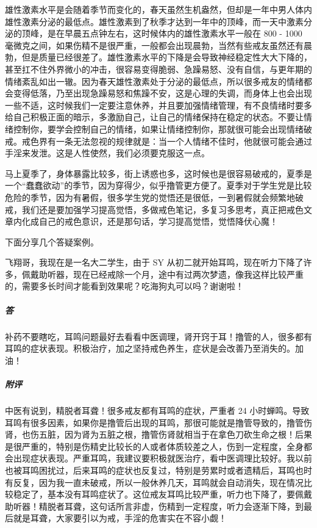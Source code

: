 雄性激素水平是会随着季节而变化的，春天虽然生机盎然，但却是一年中男人体内雄性激素分泌的最低点。雄性激素到了秋季才达到一年中的顶峰，而一天中激素分泌的顶峰，是在早晨五点钟左右，这时候体内的雄性激素水平一般在 800 - 1000 毫微克之间，如果伤精不是很严重，一般都会出现晨勃，当然有些戒友虽然还有晨勃，但是质量已经很差了。雄性激素水平的下降是会导致神经稳定性大大下降的，甚至扛不住外界微小的冲击，很容易变得脆弱、急躁易怒、没有自信，与更年期的情绪紊乱如出一辙。因为春天雄性激素处于分泌的最低点，所以很多戒友的情绪都会变得低落，乃至出现急躁易怒和焦躁不安，这是心理的失调，而身体上也会出现一些不适，这时候我们一定要注意休养，并且要加强情绪管理，有不良情绪时要多给自己积极正面的暗示，多激励自己，让自己的情绪保持在稳定的状态。不要让情绪控制你，要学会控制自己的情绪，如果让情绪控制你，那就很可能会出现情绪破戒。戒色界有一条无法忽视的规律就是：当一个人情绪不佳时，他就很可能会通过手淫来发泄。这是人性使然，我们必须要克服这一点。

马上夏季了，身体暴露比较多，街上诱惑也多，这时候也是很容易破戒的，夏季是一个“蠢蠢欲动”的季节，因为穿得少，似乎撸管更方便了。夏季对于学生党是比较危险的季节，因为有暑假，很多学生党的觉悟还是很低，一到暑假就会频繁地破戒，我们还是要加强学习提高觉悟，多做戒色笔记，多复习多思考，真正把戒色文章内化成自己的戒色意识，还是那句话，学习提高觉悟，觉悟降伏心魔！

下面分享几个答疑案例。

\begin{case}
    飞翔哥，我现在是一名大二学生，由于 SY 从初二就开始耳鸣，现在听力下降了许多，佩戴助听器，现在已经戒除一个月，途中有过两次梦遗，像我这样比较严重的，需要多长时间才能看到效果呢？吃海狗丸可以吗？谢谢啦！
    \subparagraph{答} 补药不要瞎吃，耳鸣问题最好去看看中医调理，肾开窍于耳！撸管的人，很多都有耳鸣的症状表现。积极治疗，加之坚持戒色养生，症状是会改善乃至消失的。加油！
    \subparagraph{附评} 中医有说到，精脱者耳聋！很多戒友都有耳鸣的症状，严重者 24 小时蝉鸣。导致耳鸣有很多因素，如果你是撸管后出现的耳鸣，那很可能就是撸管导致的，撸管伤肾，也伤五脏，因为肾为五脏之根，撸管伤肾就相当于在拿色刀砍生命之根！后果是很严重的，特别是伤精史比较长的人或者体质较差之人，伤到一定程度，全身都会出现症状表现。严重耳鸣，我建议要积极就医治疗，看中医调理比较好。我以前也被耳鸣困扰过，后来耳鸣的症状也反复过，特别是劳累时或者遗精后，耳鸣也时有反复，因为我一直未破戒，所以一般休养几天，耳鸣就会自动消失，现在情况比较稳定了，基本没有耳鸣症状了。这位戒友耳鸣比较严重，听力也下降了，要佩戴助听器！精脱者耳聋，这句话所言非虚，伤精到一定程度，听力会逐渐下降，到最后就是耳聋，大家要引以为戒，手淫的危害实在不容小觑！
\end{case}

